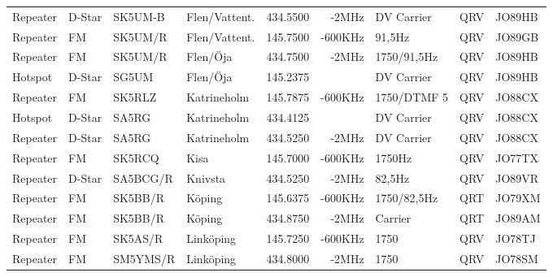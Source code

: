 \documentclass[10pt,swedish,a4paper,twoside]{article}
\begin{document}
\begin{landscape}
\begin{longtable}{llllrrlcl}
	Repeater          & D-Star       & SK5UM-B       & Flen/Vattent.     &          434.5500 &          -2MHz & DV Carrier      &       QRV       & JO89HB           \\
	Repeater          & FM           & SK5UM/R       & Flen/Vattent.     &          145.7500 &        -600KHz & 91,5Hz          &       QRV       & JO89GB           \\
	Repeater          & FM           & SK5UM/R       & Flen/Öja          &          434.7500 &          -2MHz & 1750/91,5Hz     &       QRV       & JO89HB           \\
	Hotspot           & D-Star       & SG5UM         & Flen/Öja          &          145.2375 &                & DV Carrier      &       QRV       & JO89HB           \\
	Repeater          & FM           & SK5RLZ        & Katrineholm       &          145.7875 &        -600KHz & 1750/DTMF 5     &       QRV       & JO88CX           \\
	Hotspot           & D-Star       & SA5RG         & Katrineholm       &          434.4125 &                & DV Carrier      &       QRV       & JO88CX           \\
	Repeater          & D-Star       & SA5RG         & Katrineholm       &          434.5250 &          -2MHz & DV Carrier      &       QRV       & JO88CX           \\
	Repeater          & FM           & SK5RCQ        & Kisa              &          145.7000 &        -600KHz & 1750Hz          &       QRV       & JO77TX           \\
	Repeater          & D-Star       & SA5BCG/R      & Knivsta           &          434.5250 &          -2MHz & 82,5Hz          &       QRV       & JO89VR           \\
	Repeater          & FM           & SK5BB/R       & Köping            &          145.6375 &        -600KHz & 1750/82,5Hz     &       QRT       & JO79XM           \\
	Repeater          & FM           & SK5BB/R       & Köping            &          434.8750 &          -2MHz & Carrier         &       QRT       & JO89AM           \\
	Repeater          & FM           & SK5AS/R       & Linköping         &          145.7250 &        -600KHz & 1750            &       QRV       & JO78TJ           \\
	Repeater          & FM           & SM5YMS/R      & Linköping         &          434.8000 &          -2MHz & 1750            &       QRV       & JO78SM           \\

\end{longtable}
\end{landscape}
\end{document}
